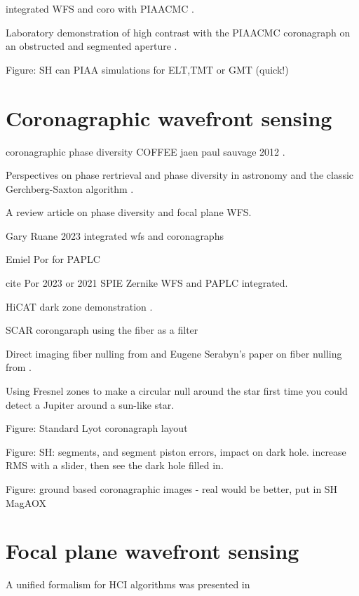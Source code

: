 \documentclass[letterpaper]{ar-1col}
\begin{document}
integrated WFS and coro with PIAACMC \citep{Haffert23a}.

Laboratory demonstration of high contrast with the PIAACMC coronagraph on an obstructed and segmented aperture \citep{Belikov22}.

Figure: SH can PIAA simulations for ELT,TMT or GMT (quick!)

\lipsum[2-4]


\section{Coronagraphic wavefront sensing}
\lipsum[2-4]

coronagraphic phase diversity
COFFEE jaen paul sauvage 2012 \citep{Sauvage12}.


Perspectives on phase rertrieval and phase diversity in astronomy \citet{Gonsalves14} and the classic Gerchberg-Saxton algorithm \citep{Gerchberg72}.

A review article on phase diversity and focal plane WFS. \citep{Fienup13}

Gary Ruane 2023 integrated wfs and coronagraphs \citep{Ruane23}

Emiel Por for PAPLC \citep{Por20}

cite Por 2023 or 2021 SPIE Zernike WFS and PAPLC integrated. \citep{Pourcelot22,Pourcelot23}

HiCAT dark zone demonstration \citep{Soummer22}.

SCAR corongaraph using the fiber as a filter \citep{Haffert20}

Direct imaging fiber nulling from \citet{Mawet17} and Eugene Serabyn's paper on fiber nulling from \citet{Serabyn06}.

Using Fresnel zones to make a circular null around the star \citep{Angel86} first time you could detect a Jupiter around a sun-like star.

Figure: Standard Lyot coronagraph layout

Figure: SH: segments, and segment piston errors, impact on dark hole. increase RMS with a slider, then see the dark hole filled in.

Figure: ground based coronagraphic images - real would be better, put in SH MagAOX 

\section{Focal plane wavefront sensing}

A unified formalism for HCI algorithms was presented in \citet{Giveon09,Giveon10}
\end{document}
